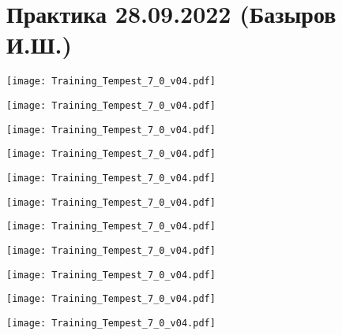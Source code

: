 \documentclass[main.tex]{subfiles}
\begin{document}

\section{Практика 28.09.2022 (Базыров И.Ш.)}

\begin{center}
\texttt{[image: Training\_Tempest\_7\_0\_v04.pdf]}
\end{center}

\begin{center}
\texttt{[image: Training\_Tempest\_7\_0\_v04.pdf]}
\end{center}

\begin{center}
\texttt{[image: Training\_Tempest\_7\_0\_v04.pdf]}
\end{center}

\begin{center}
\texttt{[image: Training\_Tempest\_7\_0\_v04.pdf]}
\end{center}

\begin{center}
\texttt{[image: Training\_Tempest\_7\_0\_v04.pdf]}
\end{center}

\begin{center}
\texttt{[image: Training\_Tempest\_7\_0\_v04.pdf]}
\end{center}

\begin{center}
\texttt{[image: Training\_Tempest\_7\_0\_v04.pdf]}
\end{center}

\begin{center}
\texttt{[image: Training\_Tempest\_7\_0\_v04.pdf]}
\end{center}

\begin{center}
\texttt{[image: Training\_Tempest\_7\_0\_v04.pdf]}
\end{center}

\begin{center}
\texttt{[image: Training\_Tempest\_7\_0\_v04.pdf]}
\end{center}

\begin{center}
\texttt{[image: Training\_Tempest\_7\_0\_v04.pdf]}
\end{center}
\end{document}

